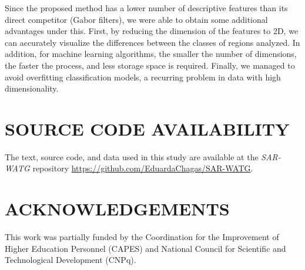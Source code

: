 \documentclass[journal]{IEEEtran}
\begin{document}
	Since the proposed method has a lower number of descriptive features than its direct competitor (Gabor filters), we were able to obtain some additional advantages under this.
	First, by reducing the dimension of the features to 2D, we can accurately visualize the differences between the classes of regions analyzed.
	In addition, for machine learning algorithms, the smaller the number of dimensions, the faster the process, and less storage space is required.
	Finally, we managed to avoid overfitting classification models, a recurring problem in data with high dimensionality.
	
	
	\section{SOURCE CODE AVAILABILITY} 
	
	The text, source code, and data used in this study are available at the \textit{SAR-WATG} repository \url{https://github.com/EduardaChagas/SAR-WATG}.
	
	
	
	
	\section*{ACKNOWLEDGEMENTS}\label{ACKNOWLEDGEMENTS}
	
	This work was partially funded by the Coordination for the Improvement of Higher Education Personnel (CAPES) and National Council for Scientific and Technological Development (CNPq).
	
\end{document}
